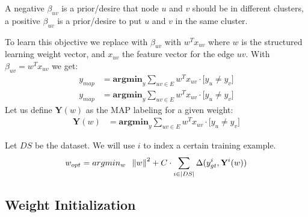 \documentclass{article}
\newcommand{\norm}[1]{\left\lVert#1\right\rVert}
\begin{document}
A negative $\beta_{uv}$ is a prior/desire that node $u$ and $v$ should be
in different clusters, a positive $\beta_{uv}$ is a prior/desire to
put $u$ and $v$ in the same cluster.

To learn this objective we replace with $\beta_{uv}$
with $w^Tx_{uv}$ where $w$ is the structured learning weight 
vector, and $x_{uv}$ the feature vector for the edge $uv$.
With  $\beta_{uv} = w^Tx_{uv}$ we get:
\begin{align*}
    y_{map} &=   
        \textbf{argmin}_{y} 
                \sum_{ uv \in E} 
                    w^Tx_{uv} \cdot \big[ y_u \neq y_v \big] \\
    y_{map} & =   
        \textbf{argmin}_{y} 
                \sum_{ uv \in E} 
                    w^Tx_{uv} \cdot \big[ y_u \neq y_v \big]
\end{align*}
Let us define $\textbf{Y}(w)$ as the MAP labeling for a given weight:
\begin{align*}
    \textbf{Y}(w) & =   
        \textbf{argmin}_{y} 
                \sum_{ uv \in E} 
                    w^Tx_{uv} \cdot \big[ y_u \neq y_v \big]
\end{align*}



Let $DS$ be the dataset.
We will use $i$ to index a certain training example.
\begin{align*}
    w_{opt} = 
        argmin_{w} 
        \hspace{0.2cm} \norm{w}^2 + 
        C \cdot 
        \sum_{i \in |DS|}  
        \Delta(y^i_{gt},\textbf{Y}^i(w))
\end{align*}

\subsection{Weight Initialization}
\end{document}
